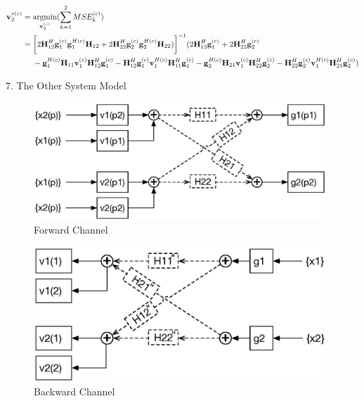 \documentclass[11pt, oneside]{article}   	%
\begin{document}
\begin{align*}
\textbf{v}^{*(c)}_{2} 	&= \operatornamewithlimits{argmin}_{\textbf{v}^{(c)}_{2}}	(\displaystyle\sum_{k=1}^{2}	MSE^{(c)}_{k})	\\
				   &= 	\bigg[ 2	\textbf{H}^{H}_{12}	\textbf{g}^{(c)}_{1}	\textbf{g}^{H(c)}_{1}		\textbf{H}_{12}
				   +	2	\textbf{H}^{H}_{22}	\textbf{g}^{(c)}_{2}	\textbf{g}^{H(c)}_{2}		\textbf{H}_{22})
				   \bigg]^{-1} 
				   (2	\textbf{H}^{H}_{12}	\textbf{g}^{(c)}_{1}	+	2	\textbf{H}^{H}_{22}	\textbf{g}^{(c)}_{2}	\\
				   &\ \ \ \ -	\textbf{g}^{H(c)}_{1}	\textbf{H}_{11}	\textbf{v}^{(c)}_{1} 	\textbf{H}^{H}_{12}	\textbf{g}^{(c)}_{1}
				   -	\textbf{H}^{H}_{12}	\textbf{g}^{(c)}_{1}	\textbf{v}^{H(c)}_{1}	\textbf{H}^{H}_{11}	\textbf{g}^{(c)}_{1}
				   -	\textbf{g}^{H(c)}_{2}	\textbf{H}_{21}	\textbf{v}^{(c)}_{1} 	\textbf{H}^{H}_{22}	\textbf{g}^{(c)}_{2}
				   -	\textbf{H}^{H}_{22}	\textbf{g}^{(c)}_{2}	\textbf{v}^{H(c)}_{1}	\textbf{H}^{H}_{21}	\textbf{g}^{(c)}_{2}
				   )
\end{align*}












\newpage

7. The Other System Model

 \begin{figure}[h]
    \centering
    \centerline{\includegraphics[width=110mm]{forward_channel_2}}
    \caption{Forward Channel}
\end{figure} 

\begin{figure}[h]
    \centering
    \centerline{\includegraphics[width=110mm]{backward_channel_2}}
    \caption{Backward Channel}
\end{figure} 
\end{document}

